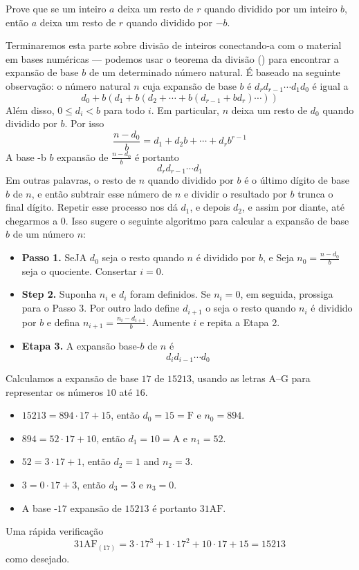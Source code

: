 \begin{exercise}
Prove que se um inteiro $a$ deixa um resto de $r$ quando dividido por um inteiro $b$, então $a$ deixa um resto de $r$ quando dividido por $-b$.
\end{exercise}

Terminaremos esta parte sobre divisão de inteiros conectando-a com o material em bases numéricas --- podemos usar o teorema da divisão () para encontrar a expansão de base $b$ de um determinado número natural. É baseado na seguinte observação: o número natural $n$ cuja expansão de base $b$ é $d_rd_{r-1} \cdots d_1 d_0$ é igual a
\[ d_0 + b(d_1 + b(d_2 + \cdots + b(d_{r-1} + bd_r) \cdots)) \]
Além disso, $0 \le d_i < b$ para todo $i$. Em particular, $n$ deixa um resto de $d_0$ quando dividido por $b$. Por isso
\[ \frac{n-d_0}{b} = d_1 + d_2b + \cdots + d_rb^{r-1} \]
A base -b $b$ expansão de $\frac{n-d_0}{b}$ é portanto
\[ d_rd_{r-1} \cdots d_1 \]
Em outras palavras, o resto de $n$ quando dividido por $b$ é o último dígito de base $b$ de $n$, e então subtrair esse número de $n$ e dividir o resultado por $b$ trunca o final dígito. Repetir esse processo nos dá $d_1$, e depois $d_2$, e assim por diante, até chegarmos a $0$.
Isso sugere o seguinte algoritmo para calcular a expansão de base $b$ de um número $n$:
\begin{itemize}
\item \textbf{Passo 1.} SeJA $d_0$ seja o resto quando $n$ é dividido por $b$, e Seja $n_0=\frac{n-d_0}{b}$ seja o quociente. Consertar $i=0$.
\item \textbf{Step 2.} Suponha $n_i$ e $d_i$ foram definidos. Se $n_i=0$, em seguida, prossiga para o Passo 3. Por outro lado define $d_{i+1}$ o seja o resto quando $n_i$ é dividido por $b$ e defina $n_{i+1} = \frac{n_i-d_{i+1}}{b}$. Aumente $i$ e repita a Etapa 2.
\item \textbf{Etapa 3.} A expansão base-$b$ de $n$ é
\[ d_id_{i-1} \cdots d_0 \]
\end{itemize}

\begin{example}
Calculamos a expansão de base $17$ de $15213$, usando as letras $\mathrm{A}$--$\mathrm{G}$ para representar os números $10$ até $16$.
\begin{itemize}
\item $15213 = 894 \cdot 17 + 15$, então $d_0=15=\mathrm{F}$ e $n_0=894$.
\item $894 = 52 \cdot 17 + 10$, então $d_1=10 = \mathrm{A}$ e $n_1=52$.
\item $52 = 3 \cdot 17 + 1$, então $d_2 = 1$ and $n_2=3$.
\item $3 = 0 \cdot 17 + 3$, então $d_3 = 3$ e $n_3=0$.
\item A base -$17$ expansão de $15213$ é portanto $31\mathrm{AF}$.
\end{itemize}
Uma rápida verificação
\[ 31\mathrm{AF}_{(17)} = 3 \cdot 17^3 + 1 \cdot 17^2 + 10 \cdot 17 + 15 = 15213 \]
como desejado.
\end{example}

